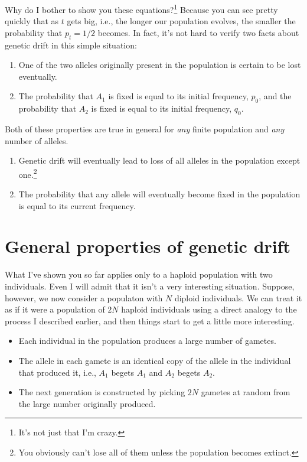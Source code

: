 \documentclass[12pt]{article}
\begin{document}
Why do I bother to show you these equations?\footnote{It's not just
that I'm crazy.} Because you can see pretty quickly that as $t$ gets
big, i.e., the longer our population evolves, the smaller the
probability that $p_t = 1/2$ becomes. In fact, it's not hard to verify
two facts about genetic drift in this simple situation:

\begin{enumerate}

\item One of the two alleles originally present in the population is
certain to be lost eventually.

\item The probability that $A_1$ is fixed is equal to its initial
frequency, $p_0$, and the probability that $A_2$ is fixed is equal to
its initial frequency, $q_0$.

\end{enumerate}

Both of these properties are true in general for {\it any\/} finite
population and {\it any\/} number of alleles.

\begin{enumerate}

\item Genetic drift will eventually lead to loss of all alleles in the
population except one.\footnote{You obviously can't lose all of them
unless the population becomes extinct.}

\item The probability that any allele will eventually become fixed in
the population is equal to its current frequency.

\end{enumerate}

\section*{General properties of genetic drift}

What I've shown you so far applies only to a haploid population with
two individuals. Even I will admit that it isn't a very interesting
situation. Suppose, however, we now consider a populaton with $N$
diploid individuals. We can treat it as if it were a population of
$2N$ haploid individuals using a direct analogy to the process I
described earlier, and then things start to get a little more
interesting.

\begin{itemize}

\item Each individual in the population produces a large number of
gametes.

\item The allele in each gamete is an identical copy of the allele in
  the individual that produced it, i.e., $A_1$ begets $A_1$ and $A_2$
  begets $A_2$.

\item The next generation is constructed by picking $2N$ gametes at
  random from the large number originally produced.

\end{itemize}
\end{document}

